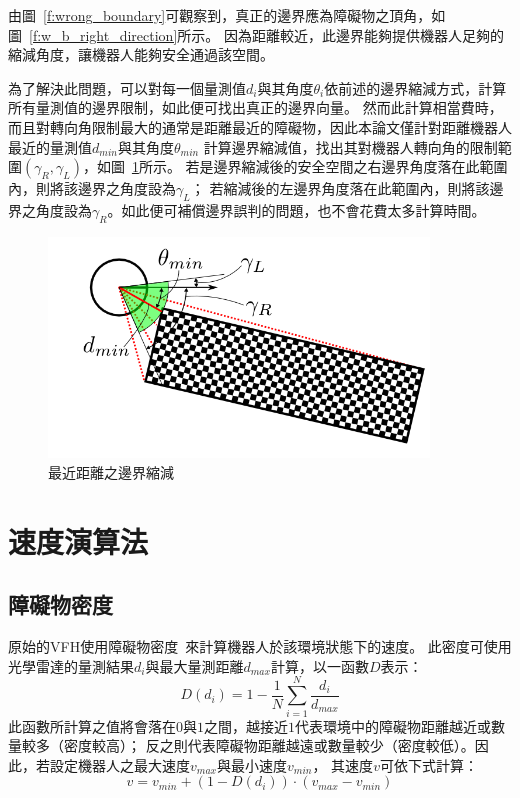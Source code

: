 由圖~\ref{f:wrong_boundary}可觀察到，真正的邊界應為障礙物之頂角，如圖~\ref{f:w_b_right_direction}所示。
因為距離較近，此邊界能夠提供機器人足夠的縮減角度，讓機器人能夠安全通過該空間。

為了解決此問題，可以對每一個量測值$d_i$與其角度$\theta_i$依前述的邊界縮減方式，計算所有量測值的邊界限制，如此便可找出真正的邊界向量。
然而此計算相當費時，而且對轉向角限制最大的通常是距離最近的障礙物，因此本論文僅計對距離機器人最近的量測值$d_{min}$與其角度$\theta_{min}$
計算邊界縮減值，找出其對機器人轉向角的限制範圍$(\gamma_R,\gamma_L)$，如圖~\ref{f:closest_boundary}所示。
若是邊界縮減後的安全空間之右邊界角度落在此範圍內，則將該邊界之角度設為$\gamma_L$；
若縮減後的左邊界角度落在此範圍內，則將該邊界之角度設為$\gamma_R$。如此便可補償邊界誤判的問題，也不會花費太多計算時間。
\begin{figure}[h!]
	\centering
	\includegraphics[width=0.9\textwidth]{figures/algorithm/closest_boundary}
	\caption{最近距離之邊界縮減}
	\label{f:closest_boundary}
\end{figure}

\section{速度演算法}
\label{sec:speed_algorithm}
\subsection{障礙物密度}
原始的VFH使用障礙物密度~\cite{Borenstein:1991:VFH}來計算機器人於該環境狀態下的速度。
此密度可使用光學雷達的量測結果$d_i$與最大量測距離$d_{max}$計算，以一函數$D$表示：
\begin{equation}
	D(d_i) = 1 - \frac{1}{N}\sum_{i=1}^{N}{\frac{d_i}{d_{max}}}
\end{equation}
此函數所計算之值將會落在$0$與$1$之間，越接近$1$代表環境中的障礙物距離越近或數量較多（密度較高）；
反之則代表障礙物距離越遠或數量較少（密度較低）。因此，若設定機器人之最大速度$v_{max}$與最小速度$v_{min}$，
其速度$v$可依下式計算：
\begin{equation}
	v = v_{min} + (1-D(d_i)) \cdot (v_{max} - v_{min})
\end{equation}

